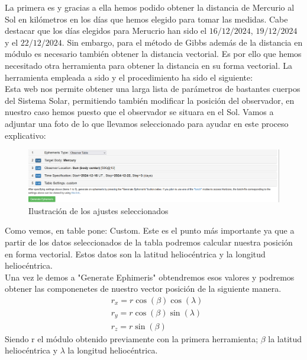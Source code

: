 \documentclass{article}
\numberwithin{equation}{section}
\begin{document}
La primera es %
y gracias a ella hemos podido obtener la distancia de 
Mercurio al Sol en kilómetros en los días que hemos elegido 
para tomar las medidas. Cabe destacar que los días elegidos 
para Merucrio han sido el $16/12/2024$, $19/12/2024$ y el 
$22/12/2024$. Sin embargo, para el método de Gibbs además de 
la distancia en módulo es necesario también obtener la distancia 
vectorial. Es por ello que hemos necesitado otra herramienta 
para obtener la distancia en su forma vectorial. La herramienta 
empleada a sido %
y el procedimiento ha sido el siguiente: \\

Esta web nos permite obtener una larga lista de parámetros 
de bastantes cuerpos del Sistema Solar, permitiendo también 
modificar la posición del observador, en nuestro caso hemos 
puesto que el observador se situara en el Sol. Vamos a 
adjuntar una foto de lo que llevamos seleccionado para 
ayudar en este proceso explicativo: 
\begin{figure}[h]
    \centering
    \includegraphics[width=1\textwidth]{b.png}
    \caption{Ilustración de los ajustes seleccionados}
\end{figure}
\newpage
Como vemos, en table pone: Custom. Este es el punto más importante 
ya que a partir de los datos seleccionados de la tabla podremos 
calcular nuestra posición en forma vectorial. Estos datos 
son la latitud heliocéntrica y la longitud heliocéntrica. \\

Una vez le demos a "Generate Ephimeris" obtendremos esos 
valores y podremos obtener las componenetes de nuestro vector 
posición de la siguiente manera. 
\begin{align*}
    &r_{x}=r\cos(\beta)\cos(\lambda) \\
    &r_{y}=r\cos(\beta)\sin(\lambda) \\
    &r_{z}=r\sin(\beta)
\end{align*}
Siendo r el módulo obtenido previamente con la primera herramienta; 
$\beta$ la latitud heliocéntrica y $\lambda$ la longitud heliocéntrica. \\
\end{document}
